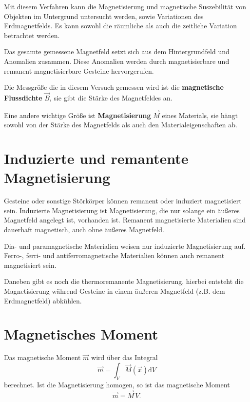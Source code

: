 Mit diesem Verfahren kann die Magnetisierung und magnetische Suszebilität von Objekten im Untergrund untersucht werden, sowie Variationen des Erdmagnetfelds. Es kann sowohl die räumliche als auch die zeitliche Variation 
betrachtet werden.

Das gesamte gemessene Magnetfeld setzt sich aus dem Hintergrundfeld und Anomalien zusammen. Diese Anomalien 
 werden durch magnetisierbare und remanent magnetisierbare Gesteine hervorgerufen. 

Die Messgröße die in diesem Versuch gemessen wird ist die \textbf{magnetische Flussdichte} $\vec{B}$, sie gibt die Stärke des Magnetfeldes an.

Eine andere wichtige Größe ist \textbf{Magnetisierung} $\vec{M}$ eines Materials, sie hängt sowohl von der Stärke des Magnetfelds als auch den Materialeigenschaften ab.

\section{Induzierte und remantente Magnetisierung}
Gesteine oder sonstige Störkörper können remanent oder induziert magnetisiert sein. Induzierte Magnetisierung ist Magnetisierung, die nur solange ein äußeres Magnetfeld angelegt ist, vorhanden ist. Remanent magnetisierte 
Materialien sind dauerhaft magnetisch, auch ohne äußeres Magnetfeld.

Dia- und paramagnetische Materialien weisen nur induzierte Magnetisierung auf. Ferro-, ferri- und antiferromagnetische Materialien können auch remanent magnetisiert sein.

Daneben gibt es noch die thermoremanente Magnetisierung, hierbei entsteht die Magnetisierung während Gesteine in einem äußeren Magnetfeld (z.B. dem Erdmagnetfeld) abkühlen.


\section{Magnetisches Moment}
Das magnetische Moment $\vec{m}$  wird über das Integral
\begin{equation}
\vec{m}  = \int_V \vec{M}(\vec{x}) \text{d}V
\end{equation}
berechnet.
Ist die Magnetisierung homogen, so ist das magnetische Moment
\begin{equation}
\vec{m}  = \vec{M} \,V.
\end{equation}

